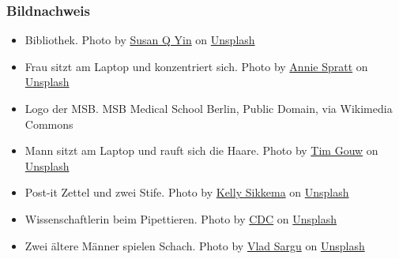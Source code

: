 \documentclass{beamer}
\begin{document}
\begin{frame}
\frametitle{Bildnachweis}


\begin{tiny}
 
\begin{itemize}

\item 
Bibliothek. Photo by \href{https://unsplash.com/@syinq?utm_content=creditCopyText&utm_medium=referral&utm_source=unsplash}{Susan Q Yin} on \href{https://unsplash.com/photos/books-on-brown-wooden-shelf-2JIvboGLeho?utm_content=creditCopyText&utm_medium=referral&utm_source=unsplash}{Unsplash}
  

\item 
Frau sitzt am Laptop und konzentriert sich. Photo by \href{https://unsplash.com/@anniespratt?utm_content=creditCopyText&utm_medium=referral&utm_source=unsplash}{Annie Spratt} on \href{https://unsplash.com/photos/woman-in-black-long-sleeve-shirt-using-macbook-air-on-brown-wooden-table-CV3nkG7XIwg?utm_content=creditCopyText&utm_medium=referral&utm_source=unsplash}{Unsplash}
  

  
\item
Logo der MSB. MSB Medical School Berlin, Public Domain, via Wikimedia Commons

\item 
Mann sitzt am Laptop und rauft sich die Haare. Photo by \href{https://unsplash.com/@punttim?utm_content=creditCopyText&utm_medium=referral&utm_source=unsplash}{Tim Gouw} on \href{https://unsplash.com/photos/man-wearing-white-top-using-macbook-1K9T5YiZ2WU?utm_content=creditCopyText&utm_medium=referral&utm_source=unsplash}{Unsplash}

\item 
Post-it Zettel und zwei Stife. Photo by \href{https://unsplash.com/@kellysikkema?utm_content=creditCopyText&utm_medium=referral&utm_source=unsplash}{Kelly Sikkema} on \href{https://unsplash.com/photos/red-marker-and-orange-pen-on-white-surface-QtSDRxvZHQc?utm_content=creditCopyText&utm_medium=referral&utm_source=unsplash}{Unsplash}
  

\item 
Wissenschaftlerin beim Pipettieren.  Photo by \href{https://unsplash.com/@cdc?utm_content=creditCopyText&utm_medium=referral&utm_source=unsplash}{CDC} on \href{https://unsplash.com/photos/woman-holding-brown-glass-_N7I1JyPYJw?utm_content=creditCopyText&utm_medium=referral&utm_source=unsplash}{Unsplash}

\item 
Zwei ältere Männer spielen Schach. Photo by \href{https://unsplash.com/@vladsargu?utm_content=creditCopyText&utm_medium=referral&utm_source=unsplash}{Vlad Sargu} on \href{https://unsplash.com/photos/two-men-playing-chess-ItphH2lGzuI?utm_content=creditCopyText&utm_medium=referral&utm_source=unsplash}{Unsplash}
   
\end{itemize}

\end{tiny}
\end{frame}
\end{document}
